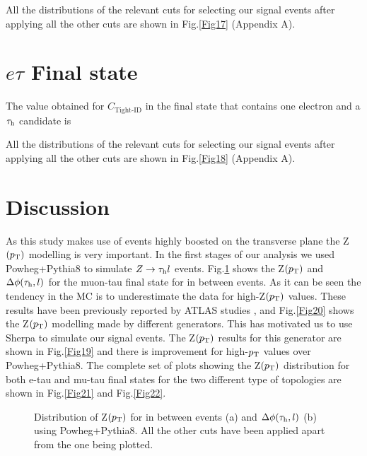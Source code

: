 All the distributions of the relevant cuts for selecting our signal events after applying all the other cuts are shown in Fig.\ref{Fig17} (Appendix A).
\section{$e\tau$ Final state}
The value obtained for $C_{\text{Tight-ID}}$ in the final state that contains one electron and a $\tau_\text{h}$ candidate is

All the distributions of the relevant cuts for selecting our signal events after applying all the other cuts are shown in Fig.\ref{Fig18} (Appendix A).
\section{Discussion}
As this study makes use of events highly boosted on the transverse plane the Z$(p_\text{T})$ modelling is very important. In the first stages of our analysis we used Powheg+Pythia8 to simulate $Z\to\tau_\text{h} l$ events. Fig.\ref{Fig23} shows the Z$(p_\text{T})$ and $\Delta\phi(\tau_\text{h},l)$ for the muon-tau final state for in between events. As it can be seen the tendency in the MC is to underestimate the data for high-Z$(p_\text{T})$ values. These results have been previously reported by ATLAS studies \cite{Aad:2019wmn}, and Fig.\ref{Fig20} shows the Z$(p_\text{T})$ modelling made by different generators. This has motivated us to use Sherpa to simulate our signal events. The Z$(p_\text{T})$ results for this generator are shown in Fig.\ref{Fig19} and there is improvement for high-$p_\text{T}$ values over Powheg+Pythia8. The complete set of plots showing the Z$(p_\text{T})$ distribution for both e-tau and mu-tau final states for the two different type of topologies are shown in Fig.\ref{Fig21} and Fig.\ref{Fig22}.
\begin{figure}[H]
	\centering
	\hfill
	\caption{Distribution of Z$(p_\text{T})$ for in between events (a) and $\Delta\phi(\tau_\text{h},l)$ (b) using Powheg+Pythia8. All the other cuts have been applied apart from the one being plotted.}
	\label{Fig23}
\end{figure}
